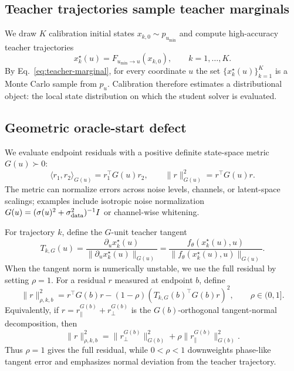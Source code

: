 \subsection{Teacher trajectories sample teacher marginals}

We draw $K$ calibration initial states $x_{k,0}\sim p_{u_{\min}}$ and compute
high-accuracy teacher trajectories
\begin{equation}
  x_k^\star(u)=F_{u_{\min}\rightarrow u}(x_{k,0}),
  \qquad k=1,\ldots,K.
\end{equation}
By Eq.~\eqref{eq:teacher-marginal}, for every coordinate $u$ the set
$\{x_k^\star(u)\}_{k=1}^K$ is a Monte Carlo sample from $p_u$. Calibration
therefore estimates a distributional object: the local state distribution on
which the student solver is evaluated.

\subsection{Geometric oracle-start defect}

We evaluate endpoint residuals with a positive definite state-space metric
$G(u)\succ0$:
\begin{equation}
  \langle r_1,r_2\rangle_{G(u)}=r_1^\top G(u)r_2,
  \qquad
  \|r\|_{G(u)}^2=r^\top G(u)r .
\end{equation}
The metric can normalize errors across noise levels, channels, or latent-space
scalings; examples include isotropic noise normalization
$G(u)=(\sigma(u)^2+\sigma_{\rm data}^2)^{-1}I$ or channel-wise whitening.

For trajectory $k$, define the $G$-unit teacher tangent
\begin{equation}
  T_{k,G}(u)
  =
  \frac{\partial_u x_k^\star(u)}
  {\|\partial_u x_k^\star(u)\|_{G(u)}}
  =
  \frac{f_\theta(x_k^\star(u),u)}
  {\|f_\theta(x_k^\star(u),u)\|_{G(u)}}.
\end{equation}
When the tangent norm is numerically unstable, we use the full residual by
setting $\rho=1$. For a residual $r$ measured at endpoint $b$, define
\begin{equation}
  \|r\|_{\rho,k,b}^2
  =
  r^\top G(b)r
  -(1-\rho)\left(T_{k,G}(b)^\top G(b)r\right)^2,
  \qquad \rho\in(0,1].
  \label{eq:mixed-norm}
\end{equation}
Equivalently, if $r=r_\parallel^{G(b)}+r_\perp^{G(b)}$ is the
$G(b)$-orthogonal tangent-normal decomposition, then
\begin{equation}
  \|r\|_{\rho,k,b}^2
  =
  \|r_\perp^{G(b)}\|_{G(b)}^2
  +
  \rho\|r_\parallel^{G(b)}\|_{G(b)}^2.
  \label{eq:mixed-decomposition}
\end{equation}
Thus $\rho=1$ gives the full residual, while $0<\rho<1$ downweights
phase-like tangent error and emphasizes normal deviation from the teacher
trajectory.

